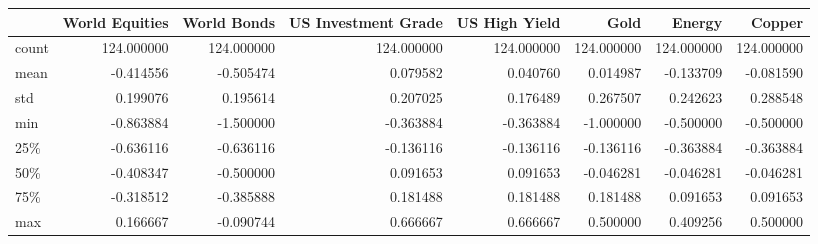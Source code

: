\begin{tabular}{lrrrrrrr}
\toprule
{} &  World Equities &  World Bonds &  US Investment Grade &  US High Yield &        Gold &      Energy &      Copper \\
\midrule
count &      124.000000 &   124.000000 &           124.000000 &     124.000000 &  124.000000 &  124.000000 &  124.000000 \\
mean  &       -0.414556 &    -0.505474 &             0.079582 &       0.040760 &    0.014987 &   -0.133709 &   -0.081590 \\
std   &        0.199076 &     0.195614 &             0.207025 &       0.176489 &    0.267507 &    0.242623 &    0.288548 \\
min   &       -0.863884 &    -1.500000 &            -0.363884 &      -0.363884 &   -1.000000 &   -0.500000 &   -0.500000 \\
25\%   &       -0.636116 &    -0.636116 &            -0.136116 &      -0.136116 &   -0.136116 &   -0.363884 &   -0.363884 \\
50\%   &       -0.408347 &    -0.500000 &             0.091653 &       0.091653 &   -0.046281 &   -0.046281 &   -0.046281 \\
75\%   &       -0.318512 &    -0.385888 &             0.181488 &       0.181488 &    0.181488 &    0.091653 &    0.091653 \\
max   &        0.166667 &    -0.090744 &             0.666667 &       0.666667 &    0.500000 &    0.409256 &    0.500000 \\
\bottomrule
\end{tabular}
